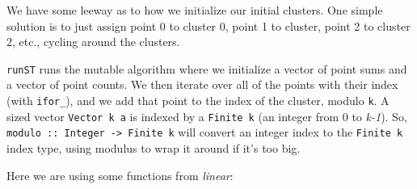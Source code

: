 \documentclass[]{article}
\newenvironment{Shaded}{}{}
\newcommand{\CommentTok}[1]{\textcolor[rgb]{0.38,0.63,0.69}{\textit{#1}}}
\newcommand{\DataTypeTok}[1]{\textcolor[rgb]{0.56,0.13,0.00}{#1}}
\newcommand{\DecValTok}[1]{\textcolor[rgb]{0.25,0.63,0.44}{#1}}
\newcommand{\FunctionTok}[1]{\textcolor[rgb]{0.02,0.16,0.49}{#1}}
\newcommand{\KeywordTok}[1]{\textcolor[rgb]{0.00,0.44,0.13}{\textbf{#1}}}
\newcommand{\NormalTok}[1]{#1}
\newcommand{\OperatorTok}[1]{\textcolor[rgb]{0.40,0.40,0.40}{#1}}
\newcommand{\OtherTok}[1]{\textcolor[rgb]{0.00,0.44,0.13}{#1}}
\begin{document}
We have some leeway as to how we initialize our initial clusters. One simple
solution is to just assign point 0 to cluster 0, point 1 to cluster, point 2 to
cluster 2, etc., cycling around the clusters.

\begin{Shaded}
\end{Shaded}

\texttt{runST} runs the mutable algorithm where we initialize a vector of point
sums and a vector of point counts. We then iterate over all of the points with
their index (with \texttt{ifor\_}), and we add that point to the index of the
cluster, modulo \texttt{k}. A sized vector \texttt{Vector\ k\ a} is indexed by a
\texttt{Finite\ k} (an integer from 0 to \emph{k-1}). So,
\texttt{modulo\ ::\ Integer\ -\textgreater{}\ Finite\ k} will convert an integer
index to the \texttt{Finite\ k} index type, using modulus to wrap it around if
it's too big.

Here we are using some functions from \emph{linear}:
\end{document}

